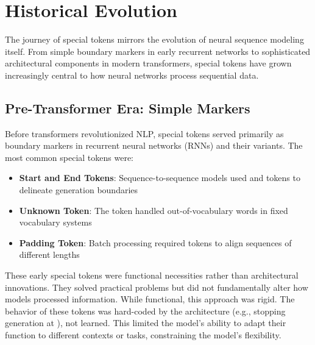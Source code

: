 \section{Historical Evolution}

The journey of special tokens mirrors the evolution of neural sequence modeling itself. From simple boundary markers in early recurrent networks to sophisticated architectural components in modern transformers, special tokens have grown increasingly central to how neural networks process sequential data.

\subsection{Pre-Transformer Era: Simple Markers}

Before transformers revolutionized NLP, special tokens served primarily as boundary markers in recurrent neural networks (RNNs) and their variants. The most common special tokens were:

\begin{itemize}
\item \textbf{Start and End Tokens}: Sequence-to-sequence models used  and  tokens to delineate generation boundaries
\item \textbf{Unknown Token}: The  token handled out-of-vocabulary words in fixed vocabulary systems
\item \textbf{Padding Token}: Batch processing required  tokens to align sequences of different lengths
\end{itemize}

These early special tokens were functional necessities rather than architectural innovations. They solved practical problems but did not fundamentally alter how models processed information. While functional, this approach was rigid. The behavior of these tokens was hard-coded by the architecture (e.g., stopping generation at ), not learned. This limited the model's ability to adapt their function to different contexts or tasks, constraining the model's flexibility.

